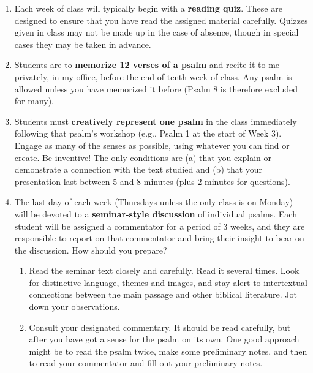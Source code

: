 \documentclass[titlepage]{article}
\begin{document}
\begin{enumerate}

  \item Each week of class will typically begin with a \textbf{reading
   quiz}. These are designed to ensure that you have read the assigned
   material carefully. Quizzes given in class may not be made up in the
   case of absence, though in special cases they may be taken in advance.

  \item Students are to \textbf{memorize 12 verses of a psalm} and recite
   it to me privately, in my office, before the end of tenth week of
   class. Any psalm is allowed unless you have memorized it before
   (Psalm 8 is therefore excluded for many).

  \item Students must \textbf{creatively represent one psalm} in the class
   immediately following that psalm’s workshop (e.g., Psalm 1 at the
   start of Week 3). Engage as many of the senses as possible, using
   whatever you can find or create. Be inventive! The only conditions
   are (a) that you explain or demonstrate a connection with the text
   studied and (b) that your presentation last between 5 and 8 minutes
   (plus 2 minutes for questions).

  \item The last day of each week (Thursdays unless the only class is on
   Monday) will be devoted to a \textbf{seminar-style discussion} of
   individual psalms. Each student will be assigned a commentator for a
   period of 3 weeks, and they are responsible to report on that
   commentator and bring their insight to bear on the discussion. How
   should you prepare?

  \begin{enumerate}

    \item Read the seminar text closely and carefully. Read it several
       times. Look for distinctive language, themes and images, and stay
       alert to intertextual connections between the main passage and
       other biblical literature. Jot down your observations.

    \item Consult your designated commentary. It should be read
       carefully, but after you have got a sense for the psalm on its
       own. One good approach might be to read the psalm twice, make
       some preliminary notes, and then to read your commentator and
       fill out your preliminary notes.


\end{enumerate}
\end{enumerate}
\end{document}
